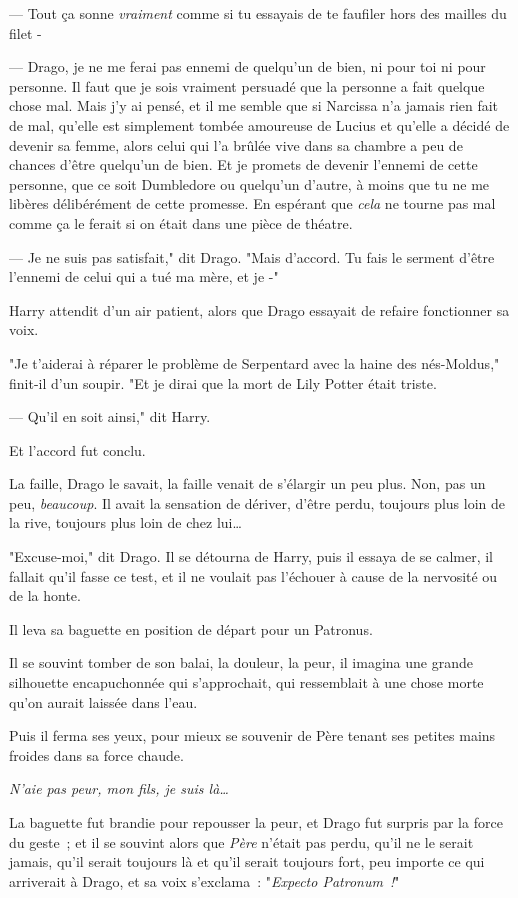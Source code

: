 --- Tout ça sonne \emph{vraiment} comme si tu essayais de te faufiler hors des mailles du filet -

--- Drago, je ne me ferai pas ennemi de quelqu'un de bien, ni pour toi ni pour personne. Il faut que je sois vraiment persuadé que la personne a fait quelque chose mal. Mais j'y ai pensé, et il me semble que si Narcissa n'a jamais rien fait de mal, qu'elle est simplement tombée amoureuse de Lucius et qu'elle a décidé de devenir sa femme, alors celui qui l'a brûlée vive dans sa chambre a peu de chances d'être quelqu'un de bien. Et je promets de devenir l'ennemi de cette personne, que ce soit Dumbledore ou quelqu'un d'autre, à moins que tu ne me libères délibérément de cette promesse. En espérant que \emph{cela} ne tourne pas mal comme ça le ferait si on était dans une pièce de théatre.

--- Je ne suis pas satisfait," dit Drago. "Mais d'accord. Tu fais le serment d'être l'ennemi de celui qui a tué ma mère, et je -"

Harry attendit d'un air patient, alors que Drago essayait de refaire fonctionner sa voix.

"Je t'aiderai à réparer le problème de Serpentard avec la haine des nés-Moldus," finit-il d'un soupir. "Et je dirai que la mort de Lily Potter était triste.

--- Qu'il en soit ainsi," dit Harry.

Et l'accord fut conclu.

La faille, Drago le savait, la faille venait de s'élargir un peu plus. Non, pas un peu, \emph{beaucoup}. Il avait la sensation de dériver, d'être perdu, toujours plus loin de la rive, toujours plus loin de chez lui…

"Excuse-moi," dit Drago. Il se détourna de Harry, puis il essaya de se calmer, il fallait qu'il fasse ce test, et il ne voulait pas l'échouer à cause de la nervosité ou de la honte.

Il leva sa baguette en position de départ pour un Patronus.

Il se souvint tomber de son balai, la douleur, la peur, il imagina une grande silhouette encapuchonnée qui s'approchait, qui ressemblait à une chose morte qu'on aurait laissée dans l'eau.

Puis il ferma ses yeux, pour mieux se souvenir de Père tenant ses petites mains froides dans sa force chaude.

\emph{N'aie pas peur, mon fils, je suis là…}

La baguette fut brandie pour repousser la peur, et Drago fut surpris par la force du geste~; et il se souvint alors que \emph{Père} n'était pas perdu, qu'il ne le serait jamais, qu'il serait toujours là et qu'il serait toujours fort, peu importe ce qui arriverait à Drago, et sa voix s'exclama~: "\emph{Expecto Patronum~!}"

